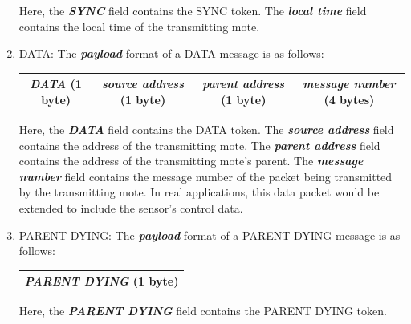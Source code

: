 \begin{enumerate}
Here, the \textit{\textbf{SYNC}} field contains the SYNC token. The \textit{\textbf{local time}} field contains the local time of the transmitting mote.
\item DATA: The \textit{\textbf{payload}} format of a DATA message is as follows:

\begin{tabular}{|c|c|c|c|}
\hline 
\textit{\textbf{DATA}} (1 byte) & \textit{\textbf{source address}} (1 byte) & \textit{\textbf{parent address}} (1 byte) & \textit{\textbf{message number}} (4 bytes) \\ 
\hline 
\end{tabular} 

Here, the \textit{\textbf{DATA}} field contains the DATA token. The \textit{\textbf{source address}} field contains the address of the transmitting mote. The \textit{\textbf{parent address}} field contains the address of the transmitting mote's parent. The \textit{\textbf{message number}} field contains the message number of the packet being transmitted by the transmitting mote. In real applications, this data packet would be extended to include the sensor's control data.
\item PARENT DYING: The \textit{\textbf{payload}} format of a PARENT DYING message is as follows:\\
\begin{tabular}{|c|}
\hline 
\textit{\textbf{PARENT DYING}} (1 byte) \\ 
\hline 
\end{tabular} 

Here, the \textit{\textbf{PARENT DYING}} field contains the PARENT DYING token.
\end{enumerate}




\newpage



